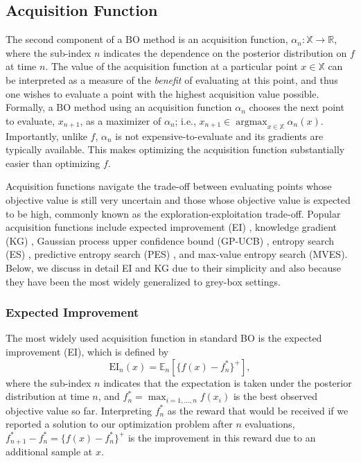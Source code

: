 \documentclass{wscpaperproc}
\newcommand{\R}{\mathbb{R}}
\newcommand{\E}{\mathbb{E}}
\newcommand{\X}{\mathbb{X}}
\newcommand{\EI}{\mathrm{EI}}
\newcommand{\savelength}[1]{} %
\DeclareMathOperator*{\argmax}{argmax}
\theoremstyle{wsc}
\begin{document}
\subsection{Acquisition Function}
The second component of a BO method is an acquisition function, $\alpha_n: \X \rightarrow \R$, where the sub-index $n$ indicates the dependence  on the posterior distribution on $f$ at time $n$. The value of the acquisition function at a particular point $x\in\X$ can be interpreted as a measure  of the \textit{benefit} of evaluating at this point, and thus one wishes to evaluate a point with the highest acquisition value possible. Formally, a BO method using an acquisition function $\alpha_n$ chooses the next point to evaluate, $x_{n+1}$, as a maximizer of $\alpha_n$; i.e.,
    $x_{n+1}\in \argmax_{x\in \X}\alpha_n(x)$.
Importantly, unlike $f$, $\alpha_n$ is not expensive-to-evaluate and its gradients are typically available. This makes optimizing the acquisition function substantially easier than optimizing $f$.

Acquisition functions navigate the trade-off between evaluating points whose objective value is still very uncertain and those whose objective value is expected to be high, commonly known as the exploration-exploitation trade-off. Popular acquisition functions include \savelength{probability of improvement (PI) \shortcite{kushner1964},} expected improvement (EI) , knowledge gradient (KG) , Gaussian process upper confidence bound (GP-UCB) , entropy search (ES) , predictive entropy search (PES) , and max-value entropy search  (MVES).  Below, we discuss in detail  EI and KG due to their simplicity and also because they have been the most widely generalized to grey-box settings.

\subsubsection{Expected Improvement}
The most widely used acquisition function in standard BO is the expected improvement (EI), which is defined by
\begin{equation*}
    \EI_n(x) = \E_n[\{f(x) - f_n^*\}^+],
\end{equation*}
where the sub-index $n$ indicates that the expectation is taken under the posterior distribution at time $n$, and $f_n^* = \max_{i=1,\ldots, n}f(x_i)$ is the best observed objective value so far. Interpreting $f^*_n$ as the reward that would be received if we reported a solution to our optimization problem after $n$ evaluations, $f_{n+1}^* - f_n^* = \{f(x) - f_n^*\}^+$ is the improvement in this reward due to an additional sample at $x$.
\end{document}

